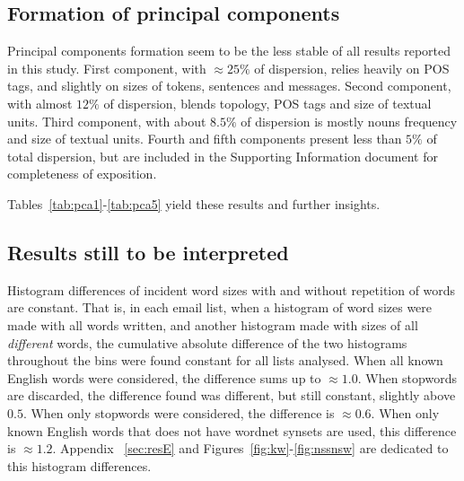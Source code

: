 \documentclass[%
 aip,
 jmp,%
 amsmath,amssymb,
 reprint,%
]{revtex4-1}
\begin{document}
\subsection{Formation of principal components}\label{subsec:pc}
Principal components formation seem to be the less stable of all results reported in this study.
First component, with $\approx 25\%$ of dispersion, relies heavily on POS tags,
and slightly on sizes of tokens, sentences and messages.
Second component, with almost $12\%$ of dispersion, blends topology, POS tags and size of textual units.
Third component, with about $8.5\%$ of dispersion is mostly nouns frequency and size of textual units.
Fourth and fifth components present less than $5\%$ of total dispersion,
but are included in the Supporting Information document for completeness of exposition.

Tables~\ref{tab:pca1}-\ref{tab:pca5} yield these results and further insights.

\subsection{Results still to be interpreted}\label{subsec:sii}
Histogram differences of incident word sizes with and without repetition of words are constant.
That is, in each email list, when a histogram of word sizes were made with all words written,
and another histogram made with sizes of all \emph{different} words,
the cumulative absolute difference of the two histograms throughout the bins were found constant for all lists analysed.
When all known English words were considered, 
the difference sums up to $\approx 1.0$.
When stopwords are discarded,
the difference found was different, but still constant, slightly above $0.5$.
When only stopwords were considered, the difference is $\approx 0.6$.
When only known English words that does not have wordnet synsets are used,
this difference is $\approx 1.2$.
Appendix ~\ref{sec:resE} and Figures~\ref{fig:kw}-\ref{fig:nssnsw} are dedicated to this histogram differences.
\end{document}
